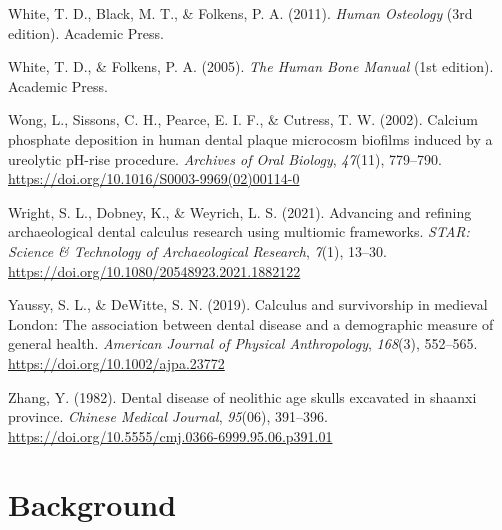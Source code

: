 \documentclass[
  letterpaper,
]{book}
\newlength{\cslhangindent}
\newlength{\cslentryspacingunit} %
\newenvironment{CSLReferences}[2] %
 {%
  \setlength{\parindent}{0pt}
  \ifodd #1
  \let\oldpar\par
  \def\par{\hangindent=\cslhangindent\oldpar}
  \fi
  \setlength{\parskip}{#2\cslentryspacingunit}
 }%
 {}
\begin{document}
\begin{CSLReferences}{1}{0}
\leavevmode{}%
White, T. D., Black, M. T., \& Folkens, P. A. (2011). \emph{Human
{Osteology}} (3rd edition). {Academic Press}.

\leavevmode{}%
White, T. D., \& Folkens, P. A. (2005). \emph{The {Human Bone Manual}}
(1st edition). {Academic Press}.

\leavevmode{}%
Wong, L., Sissons, C. H., Pearce, E. I. F., \& Cutress, T. W. (2002).
Calcium phosphate deposition in human dental plaque microcosm biofilms
induced by a ureolytic {pH-rise} procedure. \emph{Archives of Oral
Biology}, \emph{47}(11), 779--790.
\url{https://doi.org/10.1016/S0003-9969(02)00114-0}

\leavevmode{}%
Wright, S. L., Dobney, K., \& Weyrich, L. S. (2021). Advancing and
refining archaeological dental calculus research using multiomic
frameworks. \emph{STAR: Science \& Technology of Archaeological
Research}, \emph{7}(1), 13--30.
\url{https://doi.org/10.1080/20548923.2021.1882122}

\leavevmode{}%
Yaussy, S. L., \& DeWitte, S. N. (2019). Calculus and survivorship in
medieval {London}: {The} association between dental disease and a
demographic measure of general health. \emph{American Journal of
Physical Anthropology}, \emph{168}(3), 552--565.
\url{https://doi.org/10.1002/ajpa.23772}

\leavevmode{}%
Zhang, Y. (1982). Dental disease of neolithic age skulls excavated in
shaanxi province. \emph{Chinese Medical Journal}, \emph{95}(06),
391--396. \url{https://doi.org/10.5555/cmj.0366-6999.95.06.p391.01}

\end{CSLReferences}


\hypertarget{chap-background}{%
\chapter{Background}\label{chap-background}}
\end{document}
